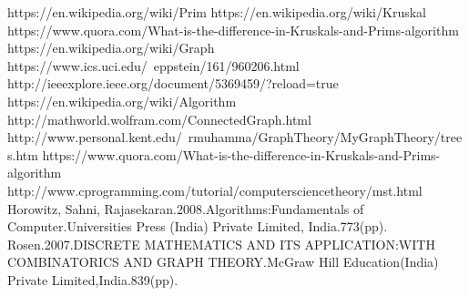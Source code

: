 \documentclass[conference,column]{IEEEtran}
\begin{document}
\begin{thebibliography}{1}

https://en.wikipedia.org/wiki/Prim%
https://en.wikipedia.org/wiki/Kruskal%
https://www.quora.com/What-is-the-difference-in-Kruskals-and-Prims-algorithm
https://en.wikipedia.org/wiki/Graph
https://www.ics.uci.edu/~eppstein/161/960206.html
http://ieeexplore.ieee.org/document/5369459/?reload=true
https://en.wikipedia.org/wiki/Algorithm
http://mathworld.wolfram.com/ConnectedGraph.html
http://www.personal.kent.edu/~rmuhamma/GraphTheory/MyGraphTheory/trees.htm
https://www.quora.com/What-is-the-difference-in-Kruskals-and-Prims-algorithm
http://www.cprogramming.com/tutorial/computersciencetheory/mst.html
Horowitz, Sahni, Rajasekaran.2008.Algorithms:Fundamentals of Computer.Universities Press (India) Private Limited, India.773(pp).
Rosen.2007.DISCRETE MATHEMATICS AND ITS APPLICATION:WITH COMBINATORICS AND GRAPH THEORY.McGraw Hill Education(India) Private Limited,India.839(pp).

\end{thebibliography}




\end{document}
